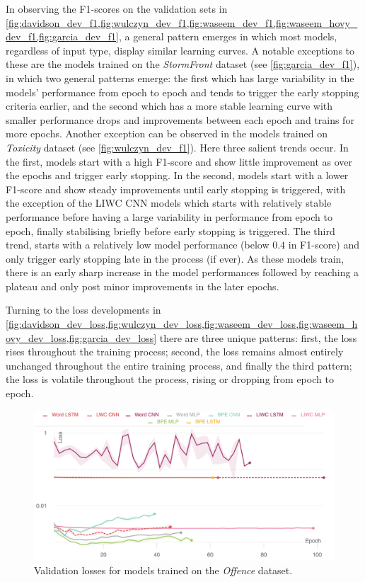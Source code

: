 In observing the F1-scores on the validation sets in \cref{fig:davidson_dev_f1,fig:wulczyn_dev_f1,fig:waseem_dev_f1,fig:waseem_hovy_dev_f1,fig:garcia_dev_f1}, a general pattern emerges in which most models, regardless of input type, display similar learning curves.
A notable exceptions to these are the models trained on the \textit{StormFront} dataset (see \cref{fig:garcia_dev_f1}), in which two general patterns emerge: the first which has large variability in the models' performance from epoch to epoch and tends to trigger the early stopping criteria earlier, and the second which has a more stable learning curve with smaller performance drops and improvements between each epoch and trains for more epochs.
Another exception can be observed in the models trained on \textit{Toxicity} dataset (see \cref{fig:wulczyn_dev_f1}). Here three salient trends occur.
In the first, models start with a high F1-score and show little improvement as over the epochs and trigger early stopping. 
In the second, models start with a lower F1-score and show steady improvements until early stopping is triggered,
with the exception of the LIWC CNN models which starts with relatively stable performance before having a large variability in performance from epoch to epoch, finally stabilising briefly before early stopping is triggered.
The third trend, starts with a relatively low model performance (below $0.4$ in F1-score) and only trigger early stopping late in the process (if ever). As these models train, there is an early sharp increase in the model performances followed by reaching a plateau and only post minor improvements in the later epochs.

Turning to the loss developments in \cref{fig:davidson_dev_loss,fig:wulczyn_dev_loss,fig:waseem_dev_loss,fig:waseem_hovy_dev_loss,fig:garcia_dev_loss} there are three unique patterns: first, the loss rises throughout the training process; second, the loss remains almost entirely unchanged throughout the entire training process, and finally the third pattern; the loss is volatile throughout the process, rising or dropping from epoch to epoch.


\begin{figure}
    \centering
    \includegraphics[width=\textwidth]{davidson_dev_loss_stderr_logscale.pdf}
    \caption{Validation losses for models trained on the \textit{Offence} dataset.}
    \label{fig:davidson_dev_loss}
\end{figure}

